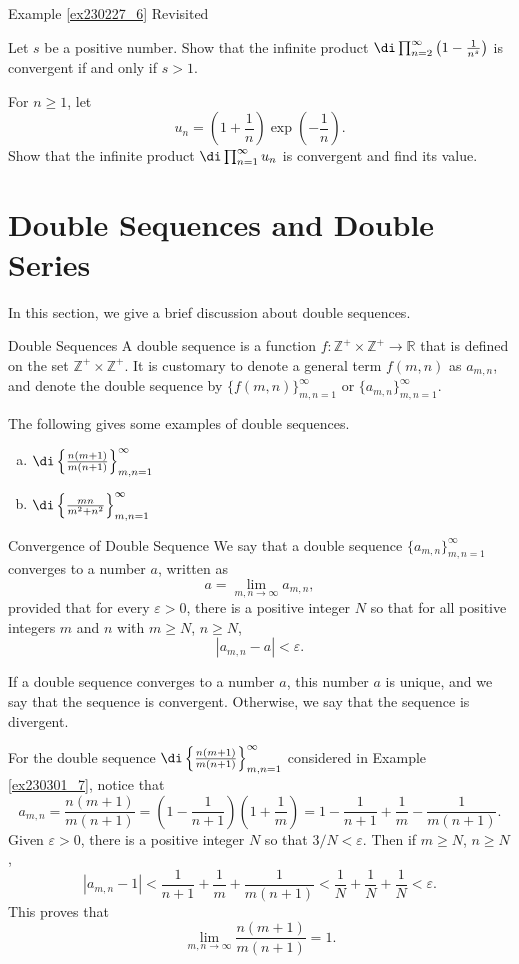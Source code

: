 \begin{example}{\linkt Example \ref{ex230227_6} Revisited}
\begin{example}[label=ex230227_13]{}
\begin{example}{}
\begin{question}{\themyquestion}
Let $s$ be a positive number. Show that the infinite product $\di\prod_{n=2}^{\infty}\left(1-\frac{1}{n^s}\right)$  is convergent if and only if $s>1$. 
\end{question}
\atc
\begin{question}{\themyquestion}
For $n\geq 1$, let
\[u_n=\left(1+\frac{1}{n}\right)\exp\left(-\frac{1}{n}\right).\]Show that the infinite product $\di\prod_{n=1}^{\infty}u_n$ is convergent and find its value.
\end{question}
\vp
\section{Double Sequences and Double Series}\label{sec5.5}
In this section, we give a brief discussion about double sequences.
\begin{definition}{Double Sequences}
A double sequence is a function $f:\mathbb{Z}^+\times\mathbb{Z}^+\to\mathbb{R}$ that is defined on the set $\mathbb{Z}^+\times\mathbb{Z}^+$. It is customary to denote a general term  $f(m,n)$
as $a_{m,n}$, and denote the double sequence by $\{f(m,n)\}_{m,n=1}^{\infty}$ or $\{a_{m,n}\}_{m,n=1}^{\infty}$.
\end{definition}
The following gives some examples of double sequences.
\begin{example}[label=ex230301_7]
{}
\begin{enumerate}[(a)]\item 
$\di\left\{\frac{n(m+1)}{m(n+1)}\right\}_{m,n=1}^{\infty}$  
\item
$\di\left\{\frac{mn}{m^2+n^2}\right\}_{m,n=1}^{\infty}$  
\end{enumerate}
\end{example}
\begin{definition}{Convergence of Double Sequence}
We say that a double sequence  $\{a_{m,n}\}_{m,n=1}^{\infty}$ converges to a number $a$, written as
\[a=\lim_{m,n\to\infty}a_{m,n},\]provided that for every $\varepsilon>0$, there is a positive integer $N$ so that for all positive integers $m$ and $n$ with $m\geq N$, $n\geq N$, 
\[\left|a_{m,n}-a\right|<\varepsilon.\]
\end{definition}
If a double sequence converges to a number $a$, this number $a$ is unique, and we say that the sequence is convergent. Otherwise, we say that the sequence is divergent.
\begin{example}[label=ex230301_8]{}
For the double sequence $\di\left\{\frac{n(m+1)}{m(n+1)}\right\}_{m,n=1}^{\infty}$   considered in Example \ref{ex230301_7}, notice that
\[a_{m,n}=\frac{n(m+1)}{m(n+1)}=\left(1-\frac{1}{n+1}\right)\left(1+\frac{1}{m}\right)=1-\frac{1}{n+1}+\frac{1}{m}-\frac{1}{m(n+1)}.\]
Given $\varepsilon>0$, there is a positive integer $N$ so that $3/N<\varepsilon$. Then if $m\geq N$, $n\geq N$,
\[|a_{m,n}-1|<\frac{1}{n+1}+\frac{1}{m}+\frac{1}{m(n+1)}<\frac{1}{N}+\frac{1}{N}+\frac{1}{N}<\varepsilon.\]This proves that
\[\lim_{m,n\to\infty}\frac{n(m+1)}{m(n+1)}=1.\]
\end{example}


\end{example}
\end{example}
\end{example}
